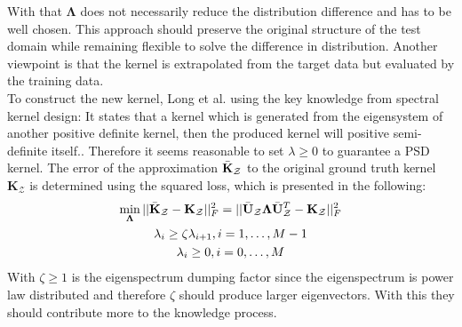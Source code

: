 With that $\boldsymbol{\Lambda}$ does not necessarily reduce the distribution difference and has to be well chosen.
This approach should preserve the original structure of the test domain while remaining flexible to solve the difference in distribution.
Another viewpoint is that the kernel is extrapolated from the target data but evaluated by the training data.\cite{Long.2015}\\
To construct the new kernel, Long et al. using the key knowledge from spectral kernel design:
It states that a kernel which is generated from the eigensystem of another positive definite kernel, then the produced kernel will positive semi-definite itself.\cite{KaiZhang.2013}.
Therefore it seems reasonable to set $\lambda \ge 0$ to guarantee a \acs{PSD} kernel.
The error of the approximation $\bar{\mathbf{K}}_\mathcal{Z}$ to the original ground truth kernel $\mathbf{K}_\mathcal{Z}$ is determined using the squared loss, which is presented in the following:\cite{Long.2015}
\begin{equation}\label{EqTKLSquareErrorLoss}
	\begin{gathered}
		\min_{\boldsymbol{\Lambda}} || \bar{\mathbf{K}}_\mathcal{Z} - \mathbf{K}_\mathcal{Z}||^2_F = || \bar{\mathbf{U}}_\mathcal{Z} \boldsymbol{\Lambda}  \bar{\mathbf{U}}_\mathcal{Z}^T - \mathbf{K}_\mathcal{Z} ||^2_F \\
		\lambda_i \ge \zeta \lambda_{i+1}, i = 1,\dots,M-1 \\
		\lambda_i \ge 0,  i = 0,\dots,M
	\end{gathered}
\end{equation}
With $\zeta \ge 1$ is the eigenspectrum dumping factor since the eigenspectrum is power law distributed and therefore $\zeta$ should produce larger eigenvectors.
With this they should contribute more to the knowledge process.\cite{Long.2015}
